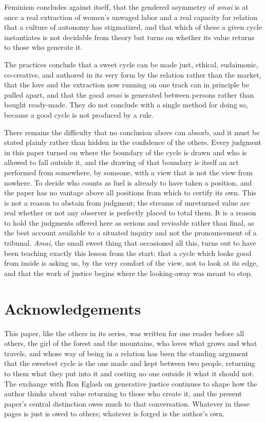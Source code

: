 \documentclass[11pt,a4paper]{article}
\newcommand{\goldrule}{\medskip\noindent{\color{gold}\rule{\linewidth}{0.4pt}}\medskip}
\begin{document}
Feminism concludes against itself, that the gendered asymmetry of \textit{amai} is at once a real extraction of women's unwaged labor and a real capacity for relation that a culture of autonomy has stigmatized, and that which of these a given cycle instantiates is not decidable from theory but turns on whether its value returns to those who generate it.

The practices conclude that a sweet cycle can be made just, ethical, eudaimonic, co-creative, and authored in its very form by the relation rather than the market, that the love and the extraction now running on one track can in principle be pulled apart, and that the good \textit{amai} is generated between persons rather than bought ready-made. They do not conclude with a single method for doing so, because a good cycle is not produced by a rule.

There remains the difficulty that no conclusion above can absorb, and it must be stated plainly rather than hidden in the confidence of the others. Every judgment in this paper turned on where the boundary of the cycle is drawn and who is allowed to fall outside it, and the drawing of that boundary is itself an act performed from somewhere, by someone, with a view that is not the view from nowhere. To decide who counts as fuel is already to have taken a position, and the paper has no vantage above all positions from which to certify its own. This is not a reason to abstain from judgment; the streams of unreturned value are real whether or not any observer is perfectly placed to total them. It is a reason to hold the judgments offered here as serious and revisable rather than final, as the best account available to a situated inquiry and not the pronouncement of a tribunal. \textit{Amai}, the small sweet thing that occasioned all this, turns out to have been teaching exactly this lesson from the start: that a cycle which looks good from inside is asking us, by the very comfort of the view, not to look at its edge, and that the work of justice begins where the looking-away was meant to stop.

\goldrule

\section*{Acknowledgements}
This paper, like the others in its series, was written for one reader before all others, the girl of the forest and the mountains, who loves what grows and what travels, and whose way of being in a relation has been the standing argument that the sweetest cycle is the one made and kept between two people, returning to them what they put into it and costing no one outside it what it should not. The exchange with Ron Eglash on generative justice continues to shape how the author thinks about value returning to those who create it, and the present paper's central distinction owes much to that conversation. Whatever in these pages is just is owed to others; whatever is forged is the author's own.
\end{document}
